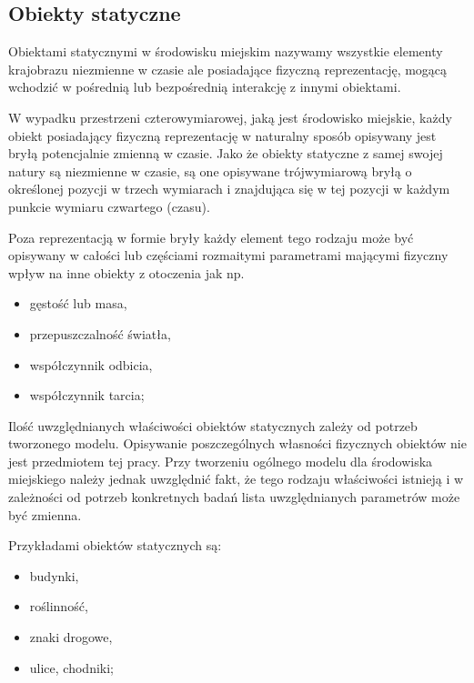 \subsection{Obiekty statyczne}
\par{
Obiektami statycznymi w środowisku miejskim nazywamy wszystkie elementy krajobrazu niezmienne w czasie ale posiadające fizyczną reprezentację, mogącą wchodzić w pośrednią lub bezpośrednią interakcję z innymi obiektami.
}
\par{
W wypadku przestrzeni czterowymiarowej, jaką jest środowisko miejskie, każdy obiekt posiadający fizyczną reprezentację w naturalny sposób opisywany jest bryłą potencjalnie zmienną w czasie. Jako że obiekty statyczne z samej swojej natury są niezmienne w czasie, są one opisywane trójwymiarową bryłą o określonej pozycji w trzech wymiarach i znajdująca się w tej pozycji w każdym punkcie wymiaru czwartego (czasu).
}
\par{
Poza reprezentacją w formie bryły każdy element tego rodzaju może być opisywany w całości lub częściami rozmaitymi parametrami mającymi fizyczny wpływ na inne obiekty z otoczenia jak np.
\begin{itemize}
\item gęstość lub masa,
\item przepuszczalność światła,
\item współczynnik odbicia,
\item współczynnik tarcia;
\end{itemize}
}
\par{
Ilość uwzględnianych właściwości obiektów statycznych zależy od potrzeb tworzonego modelu. Opisywanie poszczególnych własności fizycznych obiektów nie jest przedmiotem tej pracy. Przy tworzeniu ogólnego modelu dla środowiska miejskiego należy jednak uwzględnić fakt, że tego rodzaju właściwości istnieją i w zależności od potrzeb konkretnych badań lista uwzględnianych parametrów może być zmienna.
}
\par{
Przykładami obiektów statycznych są:
\begin{itemize}
\item budynki,
\item roślinność,
\item znaki drogowe,
\item ulice, chodniki;
\end{itemize}
}
